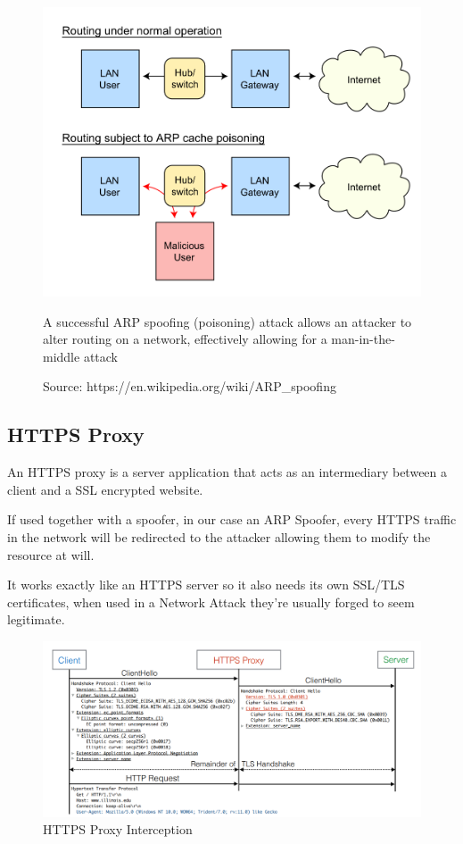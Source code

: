 \documentclass[status=normal,cover=tesi,language=en]{gmeepd}
\begin{document}
\begin{figure}[h!]
 \centering
 \includegraphics[width=13cm]{img/ARP_Spoofing.png}
 \caption{A successful ARP spoofing (poisoning) attack allows an attacker to alter routing on a network, effectively allowing for a man-in-the-middle attack}
 \caption*{Source: https://en.wikipedia.org/wiki/ARP\_spoofing}
 \label{fig: ARP Spoofing}
\end{figure}

\pagebreak

\subsection{HTTPS Proxy}

An HTTPS proxy is a server application that acts as an intermediary between a client and a SSL encrypted website.

If used together with a spoofer, in our case an ARP Spoofer, every HTTPS traffic in the network will be redirected to the attacker allowing them to modify the resource at will.

It works exactly like an HTTPS server so it also needs its own SSL/TLS certificates, when used in a Network Attack they're usually forged to seem legitimate.

\begin{figure}[h!]
 \centering
 \includegraphics[width=13cm]{img/https_proxy_interception.png}
 \caption{HTTPS Proxy Interception\protect\cite{https-interception}}
 \label{fig: HTTPS Proxy Interception}
\end{figure}
\end{document}
